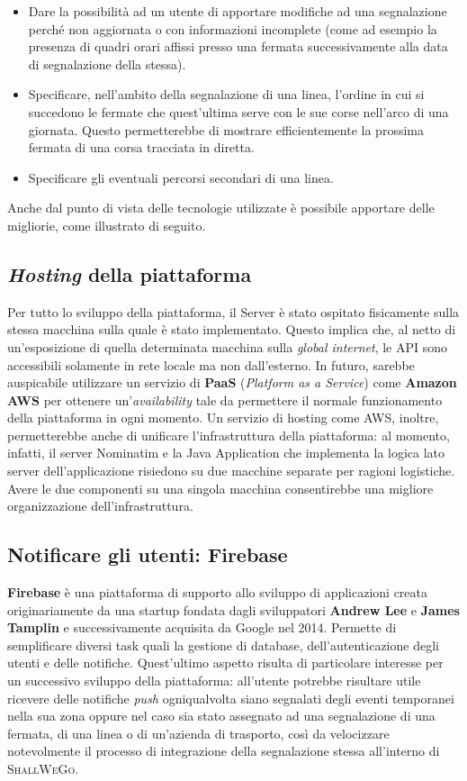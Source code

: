 		\begin{itemize}
			\item Dare la possibilità ad un utente di apportare modifiche ad una segnalazione perché non aggiornata o con informazioni incomplete (come ad esempio la presenza di quadri orari affissi presso una fermata successivamente alla data di segnalazione della stessa).
			\item Specificare, nell'ambito della segnalazione di una linea, l'ordine in cui si succedono le fermate che quest'ultima serve con le sue corse nell'arco di una giornata. Questo permetterebbe di mostrare efficientemente la prossima fermata di una corsa tracciata in diretta.
			\item Specificare gli eventuali percorsi secondari di una linea. 
		\end{itemize}

		Anche dal punto di vista delle tecnologie utilizzate è possibile apportare delle migliorie, come illustrato di seguito. 

		\subsection{\textit{Hosting} della piattaforma}
			Per tutto lo sviluppo della piattaforma, il Server è stato ospitato fisicamente sulla stessa macchina sulla quale è stato implementato. Questo implica che, al netto di un'esposizione di quella determinata macchina sulla \textit{global internet}, le API sono accessibili solamente in rete locale ma non dall'esterno. In futuro, sarebbe auspicabile utilizzare un servizio di \textbf{PaaS} (\textit{Platform as a Service}) come \textbf{Amazon AWS} per ottenere un'\textit{availability} tale da permettere il normale funzionamento della piattaforma in ogni momento. Un servizio di hosting come AWS, inoltre, permetterebbe anche di unificare l'infrastruttura della piattaforma: al momento, infatti, il server Nominatim e la Java Application che implementa la logica lato server dell'applicazione risiedono su due macchine separate per ragioni logistiche. Avere le due componenti su una singola macchina consentirebbe una migliore organizzazione dell'infrastruttura.

		\subsection{Notificare gli utenti: Firebase}
			\textbf{Firebase} è una piattaforma di supporto allo sviluppo di applicazioni creata originariamente da una startup fondata dagli sviluppatori \textbf{Andrew Lee} e \textbf{James Tamplin} e successivamente acquisita da Google nel 2014. Permette di semplificare diversi task quali la gestione di database, dell'autenticazione degli utenti e delle notifiche. Quest'ultimo aspetto risulta di particolare interesse per un successivo sviluppo della piattaforma: all'utente potrebbe risultare utile ricevere delle notifiche \textit{push} ogniqualvolta siano segnalati degli eventi temporanei nella sua zona oppure nel caso sia stato assegnato ad una segnalazione di una fermata, di una linea o di un'azienda di trasporto, così da velocizzare notevolmente il processo di integrazione della segnalazione stessa all'interno di \textsc{ShallWeGo}.